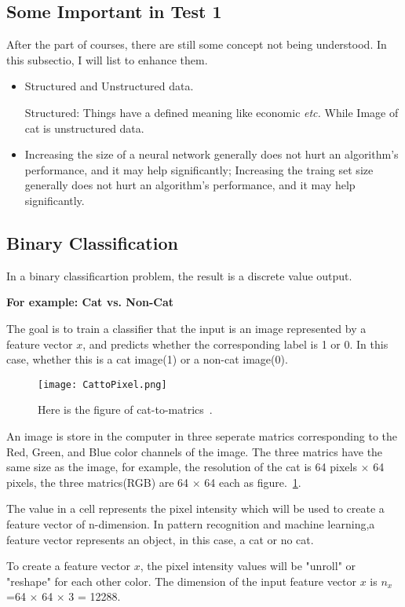 \documentclass[a4paper]{article}
\begin{document}
\subsection{Some Important in Test 1}
After the part of courses, there are still some concept not being understood. In this subsectio, I will list to enhance them.
\begin{itemize}
\item Structured and Unstructured data.\par
 Structured: Things have a defined meaning like economic \emph{etc.} While Image of cat is unstructured data.
 \item Increasing the size of a neural network generally does not hurt an algorithm's performance, and it may help significantly; Increasing the traing set size generally does not hurt an algorithm's performance, and it may help significantly.
\end{itemize}

\subsection{Binary Classification}
In a binary classificartion problem, the result is a discrete value output.\par
\textbf{For example: Cat vs. Non-Cat}\par
The goal is to train a classifier that the input is an image represented by a feature vector $x$, and predicts whether the corresponding label is 1 or 0. In this case, whether this is a cat image(1) or a non-cat image(0).\par

\begin{figure}[!htp]
\begin{center}
   \texttt{[image: CattoPixel.png]}
\end{center}
   \caption{Here is the figure of cat-to-matrics~\cite{mooc.com}\cite{Coursera.org}.}
   \label{fig:cat}
\end{figure}

An image is store in the computer in three seperate matrics corresponding to the Red, Green, and Blue color channels of the image. The three matrics have the same size as the image, for example, the resolution of the cat is 64 pixels $\times$ 64 pixels, the three matrics(RGB) are 64 $\times$ 64 each as figure.~\ref{fig:cat}.\par
The value in a cell represents the pixel intensity which will be used to create a feature vector of n-dimension. In pattern recognition and machine learning,a feature vector represents an object, in this case, a cat or no cat.\par
To create a feature vector $x$, the pixel intensity values will be "unroll" or "reshape" for each other color. The dimension of the  input feature vector $x$ is $n_x$=64 $\times$ 64 $\times$ 3 = 12288.
\end{document}
